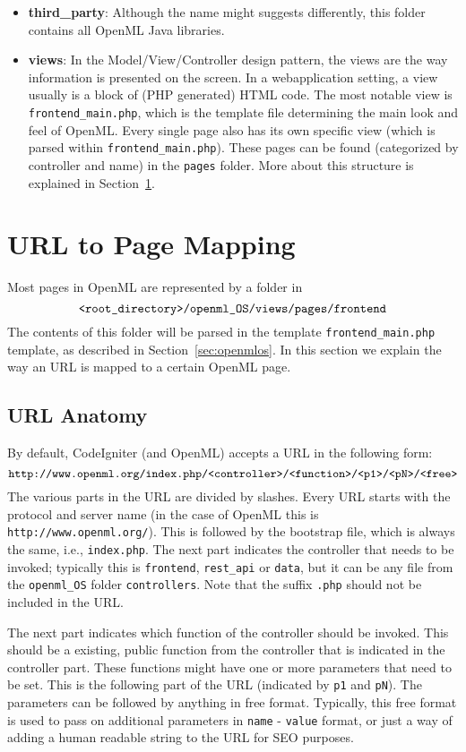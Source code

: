 \documentclass[10pt]{article}
\begin{document}
\begin{itemize}
\item \textbf{third\_party}: Although the name might suggests differently, this folder contains all OpenML Java libraries. 
\item \textbf{views}: In the Model/View/Controller design pattern, the views are the way information is presented on the screen. In a webapplication setting, a view usually is a block of (PHP generated) HTML code. The most notable view is {\tt frontend\_main.php}, which is the template file determining the main look and feel of OpenML. Every single page also has its own specific view (which is parsed within {\tt frontend\_main.php}). These pages can be found (categorized by controller and name) in the {\tt pages} folder. More about this structure is explained in Section~\ref{sec:routes}.
\end{itemize}

\section{URL to Page Mapping}
\label{sec:routes}
Most pages in OpenML are represented by a folder in 
$$\texttt{\textless root\_directory\textgreater /openml\_OS/views/pages/frontend}$$
The contents of this folder will be parsed in the template  \texttt{frontend\_main.php} template, as described in Section~\ref{sec:openmlos}. In this section we explain the way an URL is mapped to a certain OpenML page. 

\subsection{URL Anatomy}
By default, CodeIgniter (and OpenML) accepts a URL in the following form: 
$$\texttt{http://www.openml.org/index.php/\textless controller\textgreater/\textless function\textgreater/\textless p1\textgreater/\textless pN\textgreater/\textless free\textgreater}$$ 
The various parts in the URL are divided by slashes. Every URL starts with the protocol and server name (in the case of OpenML this is \texttt{http://www.openml.org/}). This is followed by the bootstrap file, which is always the same, i.e., \texttt{index.php}. The next part indicates the controller that needs to be invoked; typically this is \texttt{frontend}, \texttt{rest\_api} or \texttt{data}, but it can be any file from the \texttt{openml\_OS} folder \texttt{controllers}. Note that the suffix \texttt{.php} should not be included in the URL. 

The next part indicates which function of the controller should be invoked. This should be a existing, public function from the controller that is indicated in the controller part. These functions might have one or more parameters that need to be set. This is the following part of the URL (indicated by \texttt{p1} and \texttt{pN}). The parameters can be followed by anything in free format. Typically, this free format is used to pass on additional parameters in \texttt{name} - \texttt{value} format, or just a way of adding a human readable string to the URL for SEO purposes. 
\end{document}
